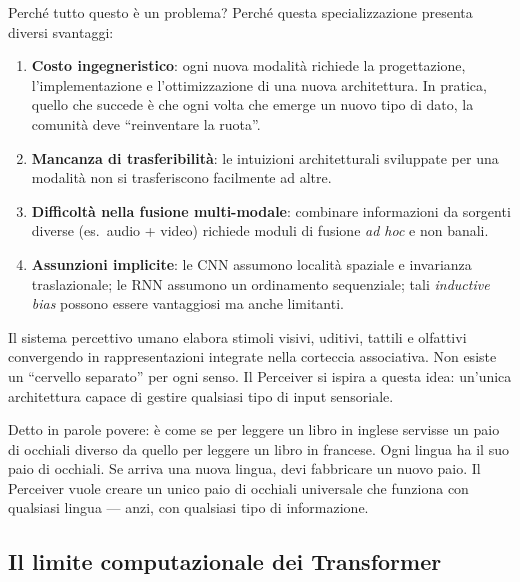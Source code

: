 \documentclass[12pt,a4paper]{article}
\begin{document}
Perch\'e tutto questo \`e un problema? Perch\'e questa specializzazione presenta diversi svantaggi:
\begin{enumerate}[label=(\roman*)]
    \item \textbf{Costo ingegneristico}: ogni nuova modalit\`a richiede la progettazione, l'implementazione e l'ottimizzazione di una nuova architettura. In pratica, quello che succede \`e che ogni volta che emerge un nuovo tipo di dato, la comunit\`a deve ``reinventare la ruota''.
    \item \textbf{Mancanza di trasferibilit\`a}: le intuizioni architetturali sviluppate per una modalit\`a non si trasferiscono facilmente ad altre.
    \item \textbf{Difficolt\`a nella fusione multi-modale}: combinare informazioni da sorgenti diverse (es.\ audio + video) richiede moduli di fusione \emph{ad hoc} e non banali.
    \item \textbf{Assunzioni implicite}: le CNN assumono localit\`a spaziale e invarianza traslazionale; le RNN assumono un ordinamento sequenziale; tali \emph{inductive bias} possono essere vantaggiosi ma anche limitanti.
\end{enumerate}

\begin{notabox}
Il sistema percettivo umano elabora stimoli visivi, uditivi, tattili e olfattivi convergendo in rappresentazioni integrate nella corteccia associativa. Non esiste un ``cervello separato'' per ogni senso. Il Perceiver si ispira a questa idea: un'unica architettura capace di gestire qualsiasi tipo di input sensoriale.
\end{notabox}

\begin{notabox}
Detto in parole povere: \`e come se per leggere un libro in inglese servisse un paio di occhiali diverso da quello per leggere un libro in francese. Ogni lingua ha il suo paio di occhiali. Se arriva una nuova lingua, devi fabbricare un nuovo paio. Il Perceiver vuole creare un unico paio di occhiali universale che funziona con qualsiasi lingua --- anzi, con qualsiasi tipo di informazione.
\end{notabox}

\subsection{Il limite computazionale dei Transformer} \label{sec:limite_transformer}
\end{document}
